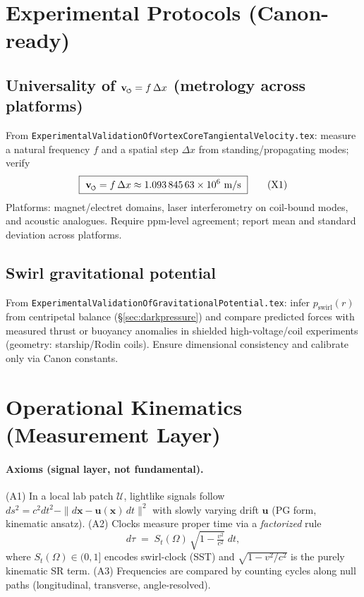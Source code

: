 \documentclass[11pt]{article}
\begin{document}
\section{Experimental Protocols (Canon-ready)}
    \label{sec:experiments}

\subsection*{Universality of $\vswirl = f\,\Delta x$ (metrology across platforms)}
    From \texttt{ExperimentalValidationOfVortexCoreTangientalVelocity.tex}: measure a natural frequency $f$ and a spatial step $\Delta x$ from standing/propagating modes; verify
        \begin{equation}
            \boxed{\ \vswirl = f\,\Delta x \approx \num{1.09384563e6}\ \si{m/s}\ } \tag{X1}
        \end{equation}
        Platforms: magnet/electret domains, laser interferometry on coil-bound modes, and acoustic analogues. Require ppm-level agreement; report mean and standard deviation across platforms.

\subsection*{Swirl gravitational potential}
From \texttt{ExperimentalValidationOfGravitationalPotential.tex}: infer $p_{\text{swirl}}(r)$ from centripetal balance (\S\ref{sec:darkpressure}) and compare predicted forces with measured thrust or buoyancy anomalies in shielded high-voltage/coil experiments (geometry: starship/Rodin coils). Ensure dimensional consistency and calibrate only via Canon constants.


\obsstrue
\newif\ifobs
\obsfalse   %

\ifobs
\section*{Operational Kinematics (Measurement Layer)}

		\paragraph{Axioms (signal layer, not fundamental).}
		(A1) In a local lab patch $\mathcal U$, lightlike signals follow $ds^2 = c^2 dt^2 - \|d\mathbf x - \mathbf u(\mathbf x)\,dt\|^2$
		with slowly varying drift $\mathbf u$ (PG form, kinematic ansatz).
		(A2) Clocks measure proper time via a \emph{factorized} rule
		\[
			d\tau \;=\; S_t(\Omega)\,\sqrt{1-\tfrac{v^2}{c^2}}\;dt,
		\]
		where $S_t(\Omega)\in(0,1]$ encodes swirl-clock (SST) and $\sqrt{1-v^2/c^2}$ is the purely kinematic SR term.
		(A3) Frequencies are compared by counting cycles along null paths (longitudinal, transverse, angle-resolved).
\end{document}
